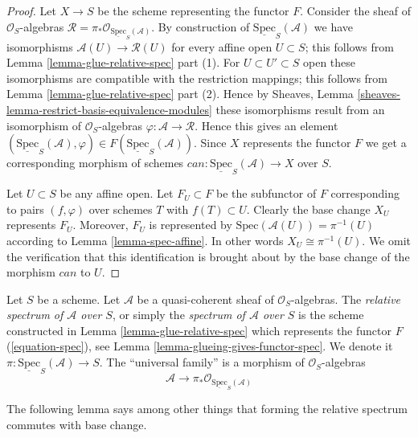 \begin{proof}
Let $X \to S$ be the scheme representing the functor $F$.
Consider the sheaf of $\mathcal{O}_S$-algebras
$\mathcal{R} = \pi_*\mathcal{O}_{\underline{\text{Spec}}_S(\mathcal{A})}$.
By construction of $\underline{\text{Spec}}_S(\mathcal{A})$
we have isomorphisms $\mathcal{A}(U) \to \mathcal{R}(U)$
for every affine open $U \subset S$; this follows from
Lemma \ref{lemma-glue-relative-spec} part (1).
For $U \subset U' \subset S$ open these isomorphisms are
compatible with the restriction mappings; this follows from
Lemma \ref{lemma-glue-relative-spec} part (2).
Hence by Sheaves, Lemma \ref{sheaves-lemma-restrict-basis-equivalence-modules}
these isomorphisms result from an isomorphism of $\mathcal{O}_S$-algebras
$\varphi : \mathcal{A} \to \mathcal{R}$. Hence this gives an element
$(\underline{\text{Spec}}_S(\mathcal{A}), \varphi)
\in F(\underline{\text{Spec}}_S(\mathcal{A}))$.
Since $X$ represents the functor $F$ we get a corresponding
morphism of schemes $can : \underline{\text{Spec}}_S(\mathcal{A}) \to X$
over $S$.

\medskip\noindent
Let $U \subset S$ be any affine open. Let $F_U \subset F$ be
the subfunctor of $F$ corresponding to pairs $(f, \varphi)$ over
schemes $T$ with $f(T) \subset U$. Clearly the base change
$X_U$ represents $F_U$. Moreover, $F_U$ is represented by
$\text{Spec}(\mathcal{A}(U)) = \pi^{-1}(U)$ according to
Lemma \ref{lemma-spec-affine}. In other words $X_U \cong \pi^{-1}(U)$.
We omit the verification that this identification is brought about
by the base change of the morphism $can$ to $U$.
\end{proof}

\begin{definition}
\label{definition-relative-spec}
Let $S$ be a scheme. Let $\mathcal{A}$ be a quasi-coherent sheaf of
$\mathcal{O}_S$-algebras. The {\it relative spectrum of $\mathcal{A}$ over
$S$}, or simply the {\it spectrum of $\mathcal{A}$ over $S$} is the scheme
constructed in Lemma \ref{lemma-glue-relative-spec} which represents the
functor $F$ (\ref{equation-spec}), see
Lemma \ref{lemma-glueing-gives-functor-spec}.
We denote it $\pi : \underline{\text{Spec}}_S(\mathcal{A}) \to S$.
The ``universal family'' is a morphism of $\mathcal{O}_S$-algebras
$$
\mathcal{A}
\longrightarrow
\pi_*\mathcal{O}_{\underline{\text{Spec}}_S(\mathcal{A})}
$$
\end{definition}

\noindent
The following lemma says among other things that forming the
relative spectrum commutes with base change.


